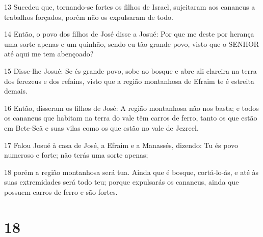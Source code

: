 \par 13 Sucedeu que, tornando-se fortes os filhos de Israel, sujeitaram aos cananeus a trabalhos forçados, porém não os expulsaram de todo.
\par 14 Então, o povo dos filhos de José disse a Josué: Por que me deste por herança uma sorte apenas e um quinhão, sendo eu tão grande povo, visto que o SENHOR até aqui me tem abençoado?
\par 15 Disse-lhe Josué: Se és grande povo, sobe ao bosque e abre ali clareira na terra dos ferezeus e dos refains, visto que a região montanhosa de Efraim te é estreita demais.
\par 16 Então, disseram os filhos de José: A região montanhosa não nos basta; e todos os cananeus que habitam na terra do vale têm carros de ferro, tanto os que estão em Bete-Seã e suas vilas como os que estão no vale de Jezreel.
\par 17 Falou Josué à casa de José, a Efraim e a Manassés, dizendo: Tu és povo numeroso e forte; não terás uma sorte apenas;
\par 18 porém a região montanhosa será tua. Ainda que é bosque, cortá-lo-ás, e até às suas extremidades será todo teu; porque expulsarás os cananeus, ainda que possuem carros de ferro e são fortes.

\chapter{18}

